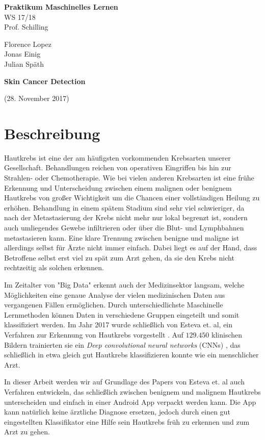 \documentclass[%
   10pt,              %
   a4paper,           %
   DIV10,             %
]{scrartcl}%
\def\header#1#2#3#4#5#6{\pagestyle{empty}
\noindent
\begin{minipage}[t]{0.6\textwidth}
\begin{flushleft}
\textbf{#4}\\%
#6\\%
#2  %
\end{flushleft}
\end{minipage}
\begin{minipage}[t]{0.4\textwidth}
\begin{flushright}
\vspace*{0.2cm}
#5%
\end{flushright}
\end{minipage}

\begin{center}
{\Large\textbf{ #1}} %

{(#3)} %
\end{center}
}
\begin{document}
\header{Skin Cancer Detection}{Prof. Schilling}{28. November 2017}{Praktikum Maschinelles Lernen}{Florence Lopez \\ Jonas Einig \\ Julian Späth}{WS 17/18}

\section*{Beschreibung}
Hautkrebs ist eine der am häufigsten vorkommenden Krebsarten unserer Gesellschaft\cite{cancer}. Behandlungen reichen von operativen Eingriffen bis hin zur Strahlen- oder Chemotherapie. Wie bei vielen anderen Krebsarten ist eine frühe Erkennung und Unterscheidung zwischen einem malignen oder benignem Hautkrebs von großer Wichtigkeit um die Chancen einer vollständigen Heilung zu erhöhen. Behandlung in einem spätem Stadium sind sehr viel schwieriger, da nach der Metastasierung der Krebs nicht mehr nur lokal begrenzt ist, sondern auch umliegendes Gewebe infiltrieren oder über die Blut- und Lymphbahnen metastasieren kann. Eine klare Trennung zwischen benigne und maligne ist allerdings selbst für Ärzte nicht immer einfach. Dabei liegt es auf der Hand, dass Betroffene selbst erst viel zu spät zum Arzt gehen, da sie den Krebs nicht rechtzeitig als solchen erkennen.

Im Zeitalter von "Big Data" erkennt auch der Medizinsektor langsam, welche Möglichkeiten    eine genaue Analyse der vielen medizinischen Daten aus vergangenen Fällen ermöglichen. Durch unterschiedlichste Maschinelle Lernmethoden können Daten in verschiedene Gruppen eingeteilt und somit klassifiziert werden. Im Jahr 2017 wurde schließlich von Esteva et. al, ein Verfahren zur Erkennung von Hautkrebs vorgestellt \cite{skincancer}. Auf $129.450$ klinischen Bildern trainierten sie ein \textit{Deep convolutional neural networks} (CNNs) \cite{cnn}, das schließlich in etwa gleich gut Hautkrebs klassifizieren konnte wie ein menschlicher Arzt.

In dieser Arbeit werden wir auf Grundlage des Papers von Esteva et. al auch Verfahren entwickeln, das schließlich zwischen benignem und malignem Hautkrebs unterscheiden und einfach in einer Android App verpackt werden kann. Die App kann natürlich keine ärztliche Diagnose ersetzen, jedoch durch einen gut eingestellten Klassifikator eine Hilfe sein Hautkrebs früh zu erkennen und zum Arzt zu gehen. 
\end{document}
